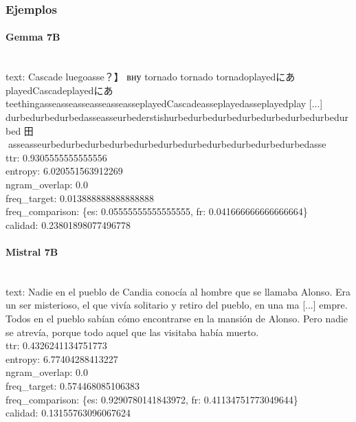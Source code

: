 \subsubsection{Ejemplos}

\paragraph{Gemma 7B}~\\
{text:} Cascade luegoasse？】 вну tornado tornado tornadoplayedにあplayedCascadeplayedにあ teethingasseasseasseasseasseasseplayedCascadeasseplayedasseplayedplay [...] durbedurbedurbedasseasseurbederstishurbedurbedurbedurbedurbedurbedurbedurbed 田asseasseurbedurbedurbedurbedurbedurbedurbedurbedurbedurbedurbedasse\\
{ttr:} 0.9305555555555556\\
{entropy:} 6.020551563912269\\
{ngram\_overlap:} 0.0\\
{freq\_target:} 0.013888888888888888\\
{freq\_comparison:} \{\textquotesingle{}es\textquotesingle{}: 0.05555555555555555, \textquotesingle{}fr\textquotesingle{}: 0.041666666666666664\}\\
{calidad:} 0.23801898077496778\\

\paragraph{Mistral 7B}~\\
{text:} Nadie en el pueblo de Candia conocía al hombre que se llamaba Alonso. Era un ser misterioso, el que vivía solitario y retiro del pueblo, en una ma [...] empre. Todos en el pueblo sabían cómo encontrarse en la mansión de Alonso. Pero nadie se atrevía, porque todo aquel que las visitaba había muerto.\\
{ttr:} 0.4326241134751773\\
{entropy:} 6.77404288413227\\
{ngram\_overlap:} 0.0\\
{freq\_target:} 0.574468085106383\\
{freq\_comparison:} \{\textquotesingle{}es\textquotesingle{}: 0.9290780141843972, \textquotesingle{}fr\textquotesingle{}: 0.41134751773049644\}\\
{calidad:} 0.13155763096067624\\

